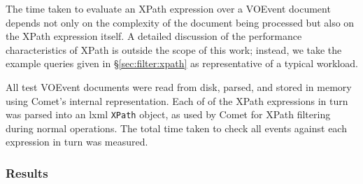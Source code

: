 \documentclass[5p,authoryear]{elsarticle}
\begin{document}
The time taken to evaluate an XPath expression over a VOEvent document depends
not only on the complexity of the document being processed but also on the
XPath expression itself. A detailed discussion of the performance
characteristics of XPath is outside the scope of this work; instead, we take
the example queries given in \S\ref{sec:filter:xpath} as representative of a
typical workload.

All test VOEvent documents were read from disk, parsed, and stored in memory
using Comet's internal representation. Each of of the XPath expressions in
turn was parsed into an lxml \texttt{XPath} object, as used by Comet for XPath
filtering during normal operations. The total time taken to check all events
against each expression in turn was measured.

\subsubsection{Results}
\label{sec:perf:individual:results}
\end{document}
